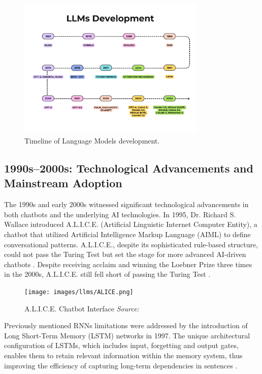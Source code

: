 \begin{figure}[h!]
    \centering
    \includegraphics[width=0.8\textwidth]{images/llms/llms-timeline.png}
    \caption{Timeline of Language Models development.}
    \label{fig:llms-history}
\end{figure}

\subsection{1990s–2000s: Technological Advancements and Mainstream Adoption}

The 1990s and early 2000s witnessed significant technological advancements in both chatbots and the underlying AI technologies. In 1995, Dr. Richard S. Wallace introduced A.L.I.C.E. (Artificial Linguistic Internet Computer Entity), a chatbot that utilized Artificial Intelligence Markup Language (AIML) to define conversational patterns. A.L.I.C.E., despite its sophisticated rule-based structure, could not pass the Turing Test but set the stage for more advanced AI-driven chatbots \cite{wallace2009anatomy}. Despite receiving acclaim and winning the Loebner Prize three times in the 2000s, A.L.I.C.E. still fell short of passing the Turing Test \cite{shum2018eliza}. 

\begin{figure}[h!]
    \centering
    \texttt{[image: images/llms/ALICE.png]}
    \caption{A.L.I.C.E. Chatbot Interface \textit{Source:} \cite{escudeiro2008}}
    \label{fig:alice_chatbot}
\end{figure}

Previously mentioned RNNs limitations were addressed by the introduction of Long Short-Term Memory (LSTM) networks in 1997. The unique architectural configuration of LSTMs, which includes input, forgetting and output gates, enables them to retain relevant information within the memory system, thus improving the efficiency of capturing long-term dependencies in sentences \cite{hochreiter1997long}.

